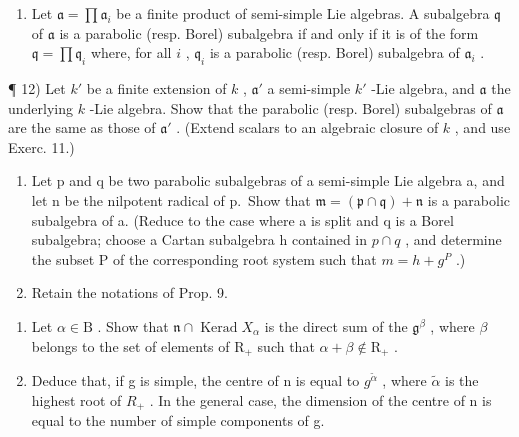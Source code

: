 \begin{enumerate}
\def\labelenumi{\arabic{enumi})}
\setcounter{enumi}{10}
\tightlist
\item
  Let \(\mathfrak{a} = \prod \mathfrak{a}_i\) be a finite product of semi-simple Lie algebras. A subalgebra \(\mathfrak{q}\) of \(\mathfrak{a}\) is a parabolic (resp. Borel) subalgebra if and only if it is of the form \(\mathfrak{q} = \prod \mathfrak{q}_i\) where, for all \(i\) , \(\mathfrak{q}_i\) is a parabolic (resp. Borel) subalgebra of \(\mathfrak{a}_i\) .
\end{enumerate}

¶ 12) Let \(k'\) be a finite extension of \(k\) , \(\mathfrak{a}'\) a semi-simple \(k'\) -Lie algebra, and \(\mathfrak{a}\) the underlying \(k\) -Lie algebra. Show that the parabolic (resp. Borel) subalgebras of \(\mathfrak{a}\) are the same as those of \(\mathfrak{a}'\) . (Extend scalars to an algebraic closure of \(k\) , and use Exerc. 11.)

\begin{enumerate}
\def\labelenumi{\arabic{enumi})}
\setcounter{enumi}{12}
\item
  Let p and q be two parabolic subalgebras of a semi-simple Lie algebra a, and let n be the nilpotent radical of p.~Show that \(\mathfrak{m} = (\mathfrak{p} \cap \mathfrak{q}) + \mathfrak{n}\) is a parabolic subalgebra of a. (Reduce to the case where a is split and q is a Borel subalgebra; choose a Cartan subalgebra h contained in \(p \cap q\) , and determine the subset P of the corresponding root system such that \(m = h + g^{P}\) .)
\item
  Retain the notations of Prop. 9.
\end{enumerate}

\begin{enumerate}
\def\labelenumi{\alph{enumi})}
\item
  Let \(\alpha \in \mathrm{B}\) . Show that \(\mathfrak{n} \cap \operatorname{Kerad} X_{\alpha}\) is the direct sum of the \(\mathfrak{g}^{\beta}\) , where \(\beta\) belongs to the set of elements of \(\mathrm{R}_{+}\) such that \(\alpha + \beta \notin \mathrm{R}_{+}\) .
\item
  Deduce that, if g is simple, the centre of n is equal to \(g^{\tilde{\alpha}}\) , where \(\tilde{\alpha}\) is the highest root of \(R_{+}\) . In the general case, the dimension of the centre of n is equal to the number of simple components of g.
\end{enumerate}
\relax{}
